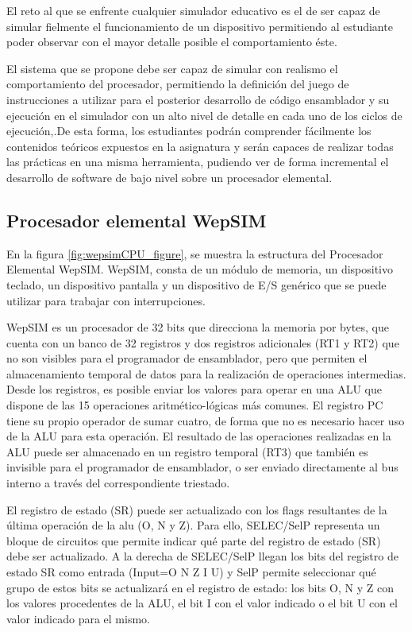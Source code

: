 El reto al que se enfrente cualquier simulador educativo es el de ser capaz de simular fielmente el funcionamiento de un dispositivo permitiendo al estudiante poder observar con el mayor detalle posible el comportamiento éste.

El sistema que se propone debe ser capaz de simular con realismo el comportamiento del procesador, permitiendo la definición del juego de instrucciones a utilizar para el posterior desarrollo de código ensamblador y su ejecución en el simulador con un alto nivel de detalle en cada uno de los ciclos de ejecución,.De esta forma, los estudiantes podrán comprender fácilmente los contenidos teóricos expuestos en la asignatura y serán capaces de realizar todas las prácticas en una misma herramienta, pudiendo ver de forma incremental el desarrollo de software de bajo nivel sobre un procesador elemental.

\subsection{Procesador elemental WepSIM}

En la figura \ref{fig:wepsimCPU_figure}, se muestra la estructura del Procesador Elemental WepSIM. WepSIM, consta de un módulo de memoria, un dispositivo teclado, un dispositivo pantalla y un dispositivo de E/S genérico que se puede utilizar para trabajar con interrupciones.

WepSIM es un procesador de 32 bits que direcciona la memoria por bytes, que cuenta con un banco de 32 registros y dos registros adicionales (RT1 y RT2) que no son visibles para el programador de ensamblador, pero que permiten el almacenamiento temporal de datos para la realización de operaciones intermedias. Desde los registros, es posible enviar los valores para operar en una ALU que dispone de las 15 operaciones aritmético-lógicas más comunes. El registro PC tiene su propio operador de sumar cuatro, de forma que no es necesario hacer uso de la ALU para esta operación. El resultado de las operaciones realizadas en la ALU puede ser almacenado en un registro temporal (RT3) que también es invisible para el programador de ensamblador, o ser enviado directamente al bus interno a través del correspondiente triestado.

El registro de estado (SR) puede ser actualizado con los flags resultantes de la última operación de la alu (O, N y Z). Para ello, SELEC/SelP representa un bloque de circuitos que permite indicar qué parte del registro de estado (SR) debe ser actualizado. A la derecha de SELEC/SelP llegan los bits del registro de estado SR como entrada (Input=O N Z I U) y SelP permite seleccionar qué grupo de estos bits se actualizará en el registro de estado: los bits O, N y Z con los valores procedentes de la ALU, el bit I con el valor indicado o el bit U con el valor indicado para el mismo.

